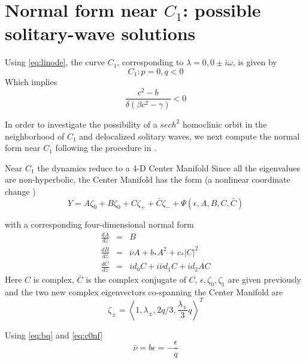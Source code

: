 \section{Normal form near $C_1$: possible solitary-wave solutions}
Using \eqref{eq:linode}, the curve $C_1$, corresponding to $\lambda = 0, 0\pm i \omega$, is given by
\begin{equation}\label{eq:c1}
C_1 : { p = 0, q < 0 }
\end{equation}
Which implies
\begin{equation}
\frac{c^2 - b}{ \delta\left(\beta c^2 - \gamma \right)} < 0
\end{equation}

In order to investigate the possibility of a $ sech^2 $  homoclinic orbit in the neighborhood of $C_1$ and delocalized solitary
waves, we next compute the normal form near $C_1$ following the procedure in \cite{IA}.

Near $C_1$ the dynamics reduce to a 4-D Center Manifold \cite{IA}
Since all the eigenvalues are non-hyperbolic, the Center Manifold has the form (a nonlinear coordinate change \cite{IA})
\begin{equation} \label{eq:c1cm}
Y = A \zeta_0 + B \zeta_0 + C \zeta_+ + \bar{C} \zeta_- + \Psi(\epsilon,A,B,C,\bar{C})
\end{equation}

with  a corresponding four-dimensional normal form
\begin{subequations}\label{eq:c1nf}
\begin{eqnarray}
\frac{dA}{dz} &=& B \\ \label{eq:aq}
\frac{dB}{dz} &=& \bar{\nu} A + b_* A^2 + c_* \left|C\right|^2 \\ \label{eq:bq}
\frac{dC}{dz} &=& i d_0 C + i \bar{\nu} d_1 C + i d_2 A C \label{eq:cq}
\end{eqnarray}
\end{subequations}
Here $C$ is complex, $\bar{C}$ is the complex conjugate of $C$, $\epsilon, \zeta_0, \zeta_1$ are given previously and the two new
complex eigenvectors co-spanning the Center Manifold are
\begin{equation}
\zeta_\pm	 = \left< 1, \lambda_\pm, 2 q / 3, \frac{\lambda_\pm}{3} q\right>^T 
\end{equation}

Using \eqref{eq:bq} and \eqref{eq:c0nf}
\begin{equation}
\bar{\nu} = b \epsilon = -\frac{\epsilon}{q} 
\end{equation}

